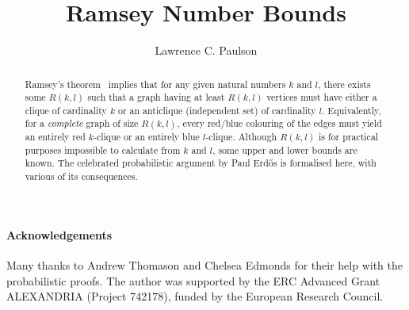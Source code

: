 \documentclass[11pt,a4paper]{article}
\begin{document}
\title{Ramsey Number Bounds}
\author{Lawrence C. Paulson}
\maketitle

\begin{abstract}
Ramsey's theorem~\cite{bollobas-graph-theory} implies that for any given natural numbers $k$ and $l$, there exists some $R(k,l)$
such that a graph having at least $R(k,l)$ vertices must have either a clique of cardinality $k$
or an anticlique (independent set) of cardinality $l$. Equivalently, for a \emph{complete} graph of size $R(k,l)$,
every red/blue colouring of the edges must yield an entirely red $k$-clique or an entirely blue $l$-clique.
Although $R(k,l)$ is for practical purposes impossible to calculate from $k$ and $l$, 
some upper and lower bounds are known. The celebrated probabilistic argument by Paul Erdős is 
formalised here, with various of its consequences.
\end{abstract}

\newpage
\tableofcontents

\paragraph*{Acknowledgements}
Many thanks to Andrew Thomason and Chelsea Edmonds for their help with the probabilistic proofs.
The author was supported by the ERC Advanced Grant ALEXANDRIA (Project 742178), funded by the European Research Council. 

\newpage





\end{document}
